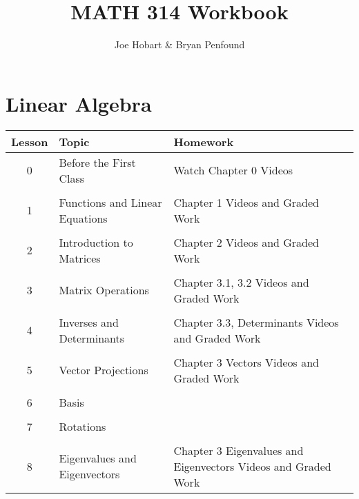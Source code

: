 \documentclass[10pt]{book}
\title{MATH 314 Workbook}
\author{Joe Hobart \& Bryan Penfound}
\date{}
\theoremstyle{definition}
\theoremstyle{remark}
\begin{document}
\maketitle
\frontmatter
\tableofcontents
\mainmatter


\chapter{Linear Algebra}
\begin{tabular}{cp{1.95in}p{3.25in}}
Lesson & Topic & Homework\\
\hline
0	&	Before the First Class			&	Watch Chapter 0 Videos\\ \\
1	&	Functions and Linear Equations	&	Chapter 1 Videos and Graded Work\\\\
2	&	Introduction to Matrices			&	Chapter 2 Videos and Graded Work\\\\
3	&	Matrix Operations				&	Chapter 3.1, 3.2 Videos and Graded Work\\\\
4	&	Inverses and Determinants		&	Chapter 3.3, Determinants Videos and Graded Work\\\\
5	&	Vector Projections				&	Chapter 3 Vectors Videos and Graded Work\\\\
6	&	Basis						&	\\\\
7	&	Rotations					&	\\\\
8	&	Eigenvalues and Eigenvectors		&	Chapter 3 Eigenvalues and Eigenvectors Videos and Graded Work\\
\end{tabular}
\newpage

\end{document}
